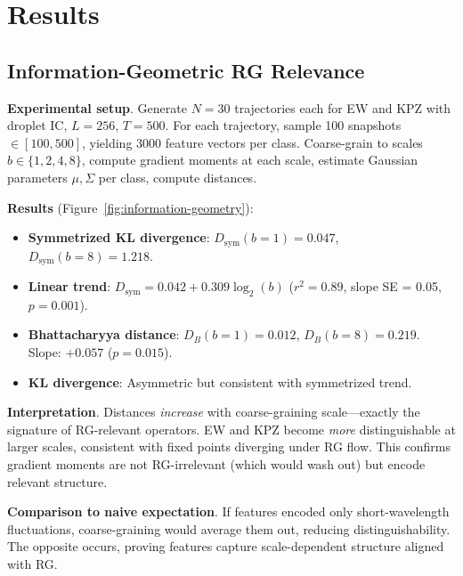 \documentclass[aps,pre,reprint,amsmath,amssymb,superscriptaddress]{revtex4-2}
\begin{document}
\section{Results}
\label{sec:results}

\subsection{Information-Geometric RG Relevance}
\label{sec:information-geometry}

\textbf{Experimental setup}. Generate $N=30$ trajectories each for EW and KPZ with droplet IC, $L=256$, $T=500$. For each trajectory, sample 100 snapshots $\in [100,500]$, yielding 3000 feature vectors per class. Coarse-grain to scales $b \in \{1,2,4,8\}$, compute gradient moments at each scale, estimate Gaussian parameters $\mu, \Sigma$ per class, compute distances.

\textbf{Results} (Figure~\ref{fig:information-geometry}):

\begin{itemize}
\item \textbf{Symmetrized KL divergence}: $D_{\text{sym}}(b=1) = 0.047$, $D_{\text{sym}}(b=8) = 1.218$.
\item \textbf{Linear trend}: $D_{\text{sym}} = 0.042 + 0.309 \log_2(b)$ ($r^2 = 0.89$, slope SE = 0.05, $p = 0.001$).
\item \textbf{Bhattacharyya distance}: $D_B(b=1) = 0.012$, $D_B(b=8) = 0.219$. Slope: $+0.057$ ($p = 0.015$).
\item \textbf{KL divergence}: Asymmetric but consistent with symmetrized trend.
\end{itemize}

\textbf{Interpretation}. Distances \textit{increase} with coarse-graining scale---exactly the signature of RG-relevant operators. EW and KPZ become \textit{more} distinguishable at larger scales, consistent with fixed points diverging under RG flow. This confirms gradient moments are not RG-irrelevant (which would wash out) but encode relevant structure.

\textbf{Comparison to naive expectation}. If features encoded only short-wavelength fluctuations, coarse-graining would average them out, reducing distinguishability. The opposite occurs, proving features capture scale-dependent structure aligned with RG.
\end{document}

